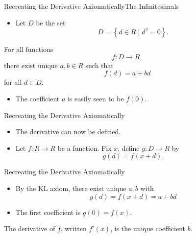 \documentclass{beamer}
\begin{document}
\begin{frame}{Recreating the Derivative Axiomatically}{The Infinitesimals}

  \begin{itemize}
    \item Let \( D \) be the set
      \begin{equation*}
        D = \left\{ d\in R\mid d^2=0 \right\}.
      \end{equation*}
  \end{itemize}

  \pause

  \begin{klaxiom}
    For all functions
    \begin{equation*}
      f:D\to R,
    \end{equation*}
    there exist unique \( a,b\in R \) such that
    \begin{equation*}
      f(d) = a + bd
    \end{equation*}
    for all \( d\in D \).
    \begin{itemize}
      \item The coefficient \( a \) is easily seen to be \( f(0) \).
    \end{itemize}

  \end{klaxiom}
\end{frame}

\begin{frame}{Recreating the Derivative Axiomatically}
  \begin{itemize}
    \item The derivative can now be defined.
    \item Let \( f:R\to R \) be a function. Fix \( x \), define \( g:D\to R \) by
      \begin{equation*}
        g(d) = f(x+d).
      \end{equation*}
  \end{itemize}
\end{frame}

\begin{frame}{Recreating the Derivative Axiomatically}

  \begin{itemize}
    \item By the KL axiom, there exist unique \( a,b \) with
      \begin{equation*}
        g(d) = f(x+d) = a + bd
      \end{equation*}
    \item The first coefficient is \( g(0) = f(x) \).
  \end{itemize}
  \pause
  \begin{defn}
    The \alert{derivative} of \( f \), written \( f'(x) \), is the unique coefficient \( b \).
  \end{defn}

\end{frame}
\end{document}
